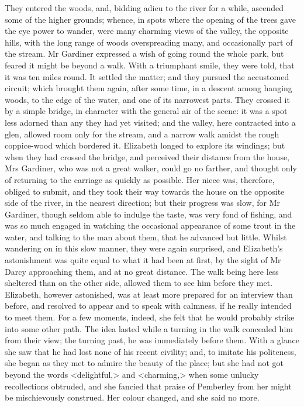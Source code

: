 They entered the woods, and, bidding adieu to the river for a while, ascended some of the higher grounds; whence, in spots where the opening of the trees gave the eye power to wander, were many charming views of the valley, the opposite hills, with the long range of woods overspreading many, and occasionally part of the stream. Mr Gardiner expressed a wish of going round the whole park, but feared it might be beyond a walk. With a triumphant smile, they were told, that it was ten miles round. It settled the matter; and they pursued the accustomed circuit; which brought them again, after some time, in a descent among hanging woods, to the edge of the water, and one of its narrowest parts. They crossed it by a simple bridge, in character with the general air of the scene: it was a spot less adorned than any they had yet visited; and the valley, here contracted into a glen, allowed room only for the stream, and a narrow walk amidst the rough coppice-wood which bordered it. Elizabeth longed to explore its windings; but when they had crossed the bridge, and perceived their distance from the house, Mrs Gardiner, who was not a great walker, could go no farther, and thought only of returning to the carriage as quickly as possible. Her niece was, therefore, obliged to submit, and they took their way towards the house on the opposite side of the river, in the nearest direction; but their progress was slow, for Mr Gardiner, though seldom able to indulge the taste, was very fond of fishing, and was so much engaged in watching the occasional appearance of some trout in the water, and talking to the man about them, that he advanced but little. Whilst wandering on in this slow manner, they were again surprised, and Elizabeth's astonishment was quite equal to what it had been at first, by the sight of Mr Darcy approaching them, and at no great distance. The walk being here less sheltered than on the other side, allowed them to see him before they met. Elizabeth, however astonished, was at least more prepared for an interview than before, and resolved to appear and to speak with calmness, if he really intended to meet them. For a few moments, indeed, she felt that he would probably strike into some other path. The idea lasted while a turning in the walk concealed him from their view; the turning past, he was immediately before them. With a glance she saw that he had lost none of his recent civility; and, to imitate his politeness, she began as they met to admire the beauty of the place; but she had not got beyond the words <delightful,> and <charming,> when some unlucky recollections obtruded, and she fancied that praise of Pemberley from her might be mischievously construed. Her colour changed, and she said no more.

